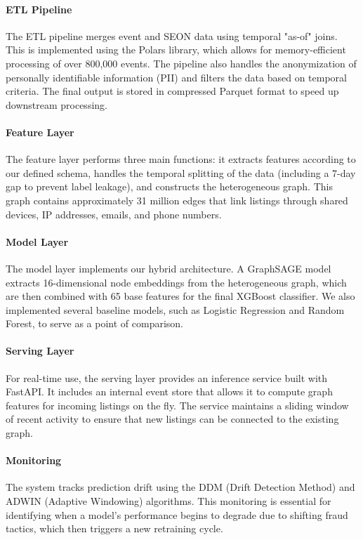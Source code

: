 \paragraph{ETL Pipeline}
The ETL pipeline merges event and SEON data using temporal "as-of" joins. This is implemented using the Polars library, which allows for memory-efficient processing of over 800,000 events. The pipeline also handles the anonymization of personally identifiable information (PII) and filters the data based on temporal criteria. The final output is stored in compressed Parquet format to speed up downstream processing.

\paragraph{Feature Layer}
The feature layer performs three main functions: it extracts features according to our defined schema, handles the temporal splitting of the data (including a 7-day gap to prevent label leakage), and constructs the heterogeneous graph. This graph contains approximately 31 million edges that link listings through shared devices, IP addresses, emails, and phone numbers.

\paragraph{Model Layer}
The model layer implements our hybrid architecture. A GraphSAGE model extracts 16-dimensional node embeddings from the heterogeneous graph, which are then combined with 65 base features for the final XGBoost classifier. We also implemented several baseline models, such as Logistic Regression and Random Forest, to serve as a point of comparison.

\paragraph{Serving Layer}
For real-time use, the serving layer provides an inference service built with FastAPI. It includes an internal event store that allows it to compute graph features for incoming listings on the fly. The service maintains a sliding window of recent activity to ensure that new listings can be connected to the existing graph.

\paragraph{Monitoring}
The system tracks prediction drift using the DDM (Drift Detection Method) and ADWIN (Adaptive Windowing) algorithms. This monitoring is essential for identifying when a model's performance begins to degrade due to shifting fraud tactics, which then triggers a new retraining cycle.


